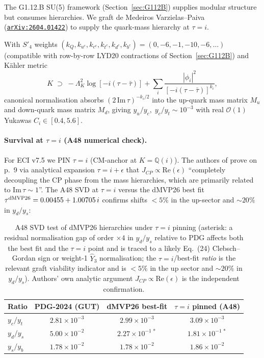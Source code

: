 \documentclass[a4paper,11pt]{article}
\newcommand{\Spf}{S'_4}
\newcommand{\arXiv}[1]{\href{https://arxiv.org/abs/#1}{\texttt{arXiv:#1}}}
\newcommand{\Qi}{\mathbb{Q}(i)}
\theoremstyle{definition}
\theoremstyle{remark}
\begin{document}
The G1.12.B SU(5) framework (Section~\ref{sec:G112B}) supplies
modular structure but consumes hierarchies.  We graft de
Medeiros Varzielas--Paiva~\cite{dMVP26} (\arXiv{2604.01422}) to
supply the quark-mass hierarchy at $\tau=i$.

With $\Spf$ weights $(k_Q,k_{u^c},k_{c^c},k_{t^c},k_{d^c},k_{b^c})
= (0,-6,-1,-10,-6,\ldots)$ (compatible with row-by-row LYD20
contractions of Section~\ref{sec:G112B}) and K\"ahler metric
\[
  K \;\supset\; -\Lambda_K^{2}\log[-i(\tau-\bar\tau)]
            + \sum_i \frac{|\phi_i|^2}{[-i(\tau-\bar\tau)]^{k_i}} ,
\]
canonical normalisation absorbs $(2\,\mathrm{Im}\,\tau)^{-k_i/2}$
into the up-quark mass matrix $M_u$ and down-quark mass matrix
$M_d$, giving $y_u/y_c,\;y_c/y_t \sim 10^{-3}$ with real
$\mathcal{O}(1)$ Yukawas $C_i\in[0.4,5.6]$.

\paragraph{Survival at $\tau=i$ (A48 numerical check).}
For ECI v7.5 we PIN $\tau = i$ (CM-anchor at $K=\Qi$).  The
authors of \cite{dMVP26} prove on p.~9 via analytical expansion
$\tau=i+\epsilon$ that $J_{CP}\propto \mathrm{Re}(\epsilon)$
``completely decoupling the CP phase from the mass hierarchies,
which are primarily related to $\mathrm{Im}\,\tau\sim 1$''.  The
A48 SVD at $\tau=i$ versus the dMVP26 best fit
$\tau^{\rm dMVP26}=0.00455 + 1.00705\,i$ confirms shifts
$<5\%$ in the up-sector and $\sim 20\%$ in $y_d/y_s$:
\begin{table}[ht]
\centering
\begin{tabular}{lccc}
\toprule
Ratio & PDG-2024 (GUT) & dMVP26 best-fit & $\tau=i$ pinned (A48) \\
\midrule
$y_c/y_t$ & $2.81\times 10^{-3}$ & $2.99\times 10^{-3}$ & $3.09\times 10^{-3}$ \\
$y_d/y_s$ & $5.00\times 10^{-2}$ & $2.27\times 10^{-1\,*}$ & $1.81\times 10^{-1\,*}$ \\
$y_s/y_b$ & $1.78\times 10^{-2}$ & $1.78\times 10^{-2}$ & $1.86\times 10^{-2}$ \\
\bottomrule
\end{tabular}
\caption{A48 SVD test of dMVP26 hierarchies under $\tau=i$
pinning (asterisk: a residual normalisation gap of order
$\times 4$ in $y_d/y_s$ relative to PDG affects both the best
fit and the $\tau=i$ point and is traced to a likely
Eq.~(24) Clebsch--Gordan sign or weight-1
$\hat{Y}_3$ normalisation; the $\tau=i$/best-fit \emph{ratio}
is the relevant graft viability indicator and is $<5\%$ in the
up sector and $\sim 20\%$ in $y_d/y_s$).  Authors' own analytic
argument $J_{CP}\propto \mathrm{Re}(\epsilon)$ is the
independent confirmation.}
\label{tab:A48}
\end{table}
\end{document}
